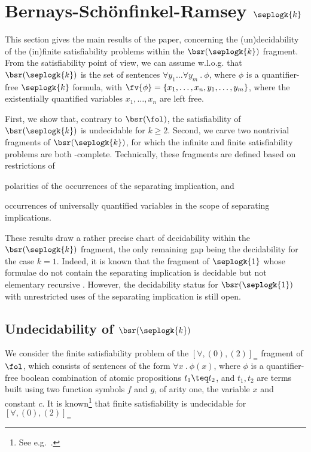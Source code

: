 \section{Bernays-Sch\"onfinkel-Ramsey $\seplogk{k}$}
\label{sec:bsr-sl}

This section gives the main results of the paper, concerning the
(un)decidability of the (in)finite satisfiability problems within the
$\bsr(\seplogk{k})$ fragment. From the satisfiability point of view,
we can assume w.l.o.g. that $\bsr(\seplogk{k})$ is the set of
sentences $\forall y_1 \ldots \forall y_m ~.~ \phi$, where $\phi$ is a
quantifier-free $\seplogk{k}$ formula, with $\fv{\phi} =
\{x_1,\ldots,x_n, \\ y_1,\ldots,y_m\}$, where the existentially
quantified variables $x_1,\ldots,x_n$ are left free.

First, we show that, contrary to $\bsr(\fol)$, the satisfiability of
$\bsr(\seplogk{k})$ is undecidable for $k\geq2$. Second, we carve two
nontrivial fragments of $\bsr(\seplogk{k})$, for which the infinite
and finite satisfiability problems are
both \pspace-complete. Technically, these fragments are defined based
on restrictions of \begin{inparaenum}[(i)]
\item polarities of the occurrences of the separating implication,
  and
%
\item occurrences of universally quantified variables in the scope of
  separating implications.
\end{inparaenum}

These results draw a rather precise chart of decidability within the
$\bsr(\seplogk{k})$ fragment, the only remaining gap being the
decidability for the case $k=1$. Indeed, it is known that the fragment
of $\seplogk{1}$ whose formulae do not contain the separating
implication is decidable but not elementary recursive
\cite{BrocheninDemriLozes11}. However, the decidability status for
$\bsr(\seplogk{1})$ with unrestricted uses of the separating
implication is still open.

\subsection{Undecidability of $\bsr(\seplogk{k})$}
\label{sec:bsr-sl-undec}

We consider the finite satisfiability problem of the
$[\forall,(0),(2)]_=$ fragment of $\fol$, which consists of sentences
of the form $\forall x ~.~ \phi(x)$, where $\phi$ is a quantifier-free
boolean combination of atomic propositions $t_1 \teq t_2$, and $t_1,
t_2$ are terms built using two function symbols $f$ and $g$, of arity
one, the variable $x$ and constant $c$. It is known\footnote{See
  e.g.\ \cite[Theorem 4.1.8]{BorgerGradelGurevich97}.} that finite
satisfiability is undecidable for $[\forall,(0),(2)]_=$

